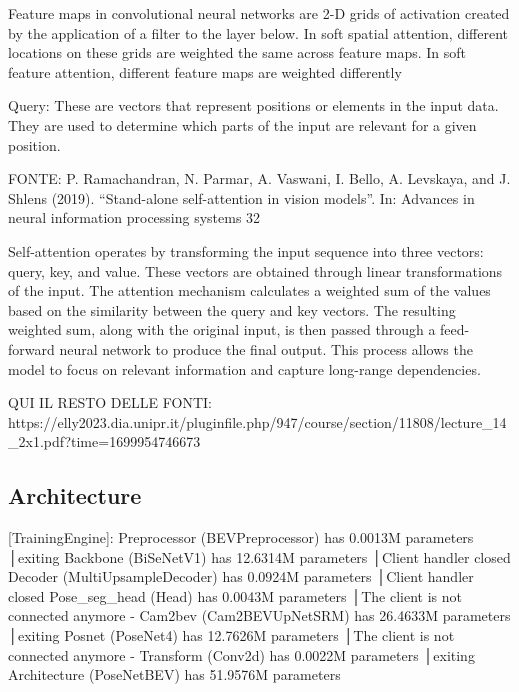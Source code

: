 Feature maps in convolutional neural
networks are 2-D grids of activation
created by the application of a filter to
the layer below. In soft spatial
attention, different locations on these
grids are weighted the same across
feature maps.
In soft feature attention, different
feature maps are weighted differently

Query: These are vectors that represent positions or elements in the input
data. They are used to determine which parts of the input are relevant for a
given position.

FONTE: 
P. Ramachandran, N. Parmar, A. Vaswani, I. Bello, A. Levskaya, and J. Shlens (2019). “Stand-alone self-attention in vision models”. In:
Advances in neural information processing systems 32

Self-attention operates by transforming the input sequence into three vectors:
query, key, and value.
These vectors are obtained through linear transformations of the input. The
attention mechanism calculates a weighted sum of the values based on the
similarity between the query and key vectors.
The resulting weighted sum, along with the original input, is then passed
through a feed-forward neural network to produce the final output.
This process allows the model to focus on relevant information and capture
long-range dependencies.


QUI IL RESTO DELLE FONTI:
https://elly2023.dia.unipr.it/pluginfile.php/947/course/section/11808/lecture_14_2x1.pdf?time=1699954746673


\subsection{Architecture}

[TrainingEngine]: Preprocessor (BEVPreprocessor) has 0.0013M parameters                                                                                             │exiting
                  Backbone (BiSeNetV1) has 12.6314M parameters                                                                                                      │Client handler closed
                  Decoder (MultiUpsampleDecoder) has 0.0924M parameters                                                                                             │Client handler closed
                  Pose_seg_head (Head) has 0.0043M parameters                                                                                                       │The client is not connected anymore - 
                  Cam2bev (Cam2BEVUpNetSRM) has 26.4633M parameters                                                                                                 │exiting
                  Posnet (PoseNet4) has 12.7626M parameters                                                                                                         │The client is not connected anymore - 
                  Transform (Conv2d) has 0.0022M parameters                                                                                                         │exiting
                  Architecture (PoseNetBEV) has 51.9576M parameters

